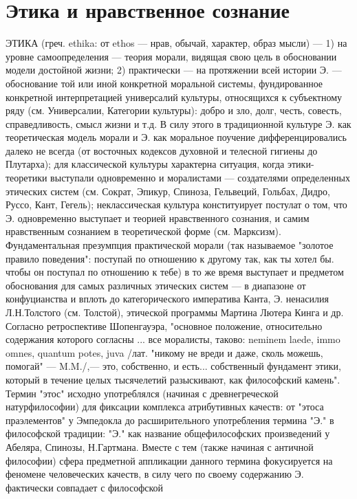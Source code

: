 \documentclass[12pt]{article}
\begin{document}
\newpage
\section{Этика и нравственное сознание}
ЭТИКА (греч. ethika: от ethos — нрав, обычай, характер, образ мысли) — 1) на уровне самоопределения —
теория морали, видящая свою цель в обосновании модели достойной жизни; 2) практически — на протяжении
всей истории Э. — обоснование той или иной конкретной моральной системы, фундированное конкретной
интерпретацией  универсалий  культуры,  относящихся  к  субъектному  ряду  (см.  Универсалии,  Категории
культуры): добро и зло, долг, честь, совесть, справедливость, смысл жизни и т.д. В силу этого в традиционной
культуре Э. как теоретическая модель морали и Э. как моральное поучение дифференцировались далеко не
всегда  (от  восточных  кодексов  духовной  и  телесной  гигиены  до  Плутарха);  для  классической  культуры
характерна  ситуация,  когда  этики-теоретики  выступали  одновременно  и  моралистами  —  создателями
определенных этических систем (см. Сократ, Эпикур, Спиноза, Гельвеций, Гольбах, Дидро, Руссо, Кант, Гегель);
неклассическая  культура  конституирует  постулат  о  том,  что  Э.  одновременно  выступает  и  теорией
нравственного  сознания,  и  самим  нравственным  сознанием  в  теоретической  форме  (см.  Марксизм).
Фундаментальная презумпция практической морали (так называемое "золотое правило поведения": поступай по
отношению к другому так, как ты хотел бы. чтобы он поступал по отношению к тебе) в то же время выступает и
предметом обоснования для самых различных этических систем — в диапазоне от конфуцианства и вплоть до
категорического императива Канта, Э. ненасилия Л.Н.Толстого (см. Толстой), этической программы Мартина
Лютера Кинга и др. Согласно ретроспективе Шопенгауэра, "основное положение, относительно содержания
которого согласны ... все моралисты, таково: neminem laede, immo omnes, quantum potes, juva /лат. "никому не
вреди и даже, сколь можешь, помогай" — M.M./,— это, собственно, и есть... собственный фундамент этики,
который  в  течение  целых  тысячелетий  разыскивают,  как  философский  камень".  Термин  "этос"  исходно
употреблялся (начиная с древнегреческой натурфилософии) для фиксации комплекса атрибутивных качеств: от
"этоса праэлементов" у Эмпедокла до расширительного употребления термина "Э." в философской традиции: 
"Э." как название общефилософских произведений у Абеляра, Спинозы, Н.Гартмана. Вместе с тем (также
начиная с античной философии) сфера предметной аппликации данного термина фокусируется на феномене
человеческих  качеств,  в  силу  чего  по  своему  содержанию  Э.  фактически  совпадает  с  философской
\end{document}
